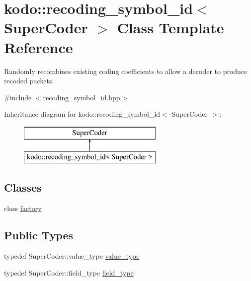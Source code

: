 \hypertarget{classkodo_1_1recoding__symbol__id}{\section{kodo\-:\-:recoding\-\_\-symbol\-\_\-id$<$ Super\-Coder $>$ Class Template Reference}
\label{classkodo_1_1recoding__symbol__id}
}


Randomly recombines existing coding coefficients to allow a decoder to produce recoded packets.  




{\ttfamily \#include $<$recoding\-\_\-symbol\-\_\-id.\-hpp$>$}

Inheritance diagram for kodo\-:\-:recoding\-\_\-symbol\-\_\-id$<$ Super\-Coder $>$\-:\begin{figure}[H]
\begin{center}
\leavevmode
\includegraphics[height=2.000000cm]{classkodo_1_1recoding__symbol__id}
\end{center}
\end{figure}
\subsection*{Classes}
\begin{DoxyCompactItemize}
\item 
class \hyperlink{classkodo_1_1recoding__symbol__id_1_1factory}{factory}
\end{DoxyCompactItemize}
\subsection*{Public Types}
\begin{DoxyCompactItemize}
\item 
typedef Super\-Coder\-::value\-\_\-type \hyperlink{classkodo_1_1recoding__symbol__id_a19f9efc1f1e46258f9029d346bbfa151}{value\-\_\-type}
\begin{DoxyCompactList}\small\item\em \end{DoxyCompactList}\item 
typedef Super\-Coder\-::field\-\_\-type \hyperlink{classkodo_1_1recoding__symbol__id_a6b83353dedd55de580713f355e02a8cc}{field\-\_\-type}
\begin{DoxyCompactList}\small\item\em \end{DoxyCompactList}\end{DoxyCompactItemize}
